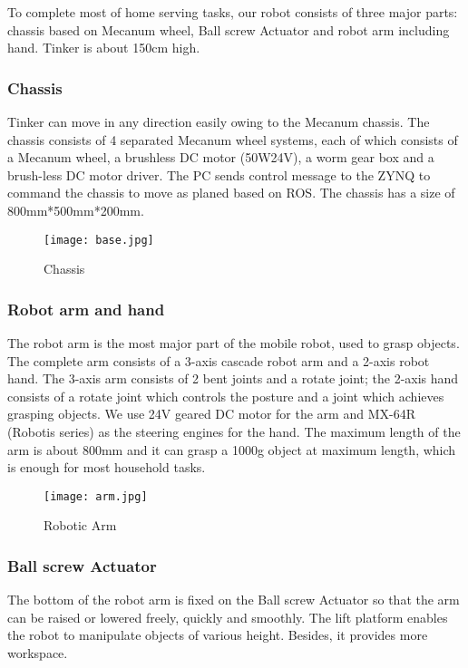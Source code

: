To complete most of home serving tasks, our robot consists of three major parts: chassis based on Mecanum wheel, Ball screw Actuator and robot arm including hand. Tinker is about 150cm high. 
\subsubsection{Chassis}
Tinker can move in any direction easily owing to the Mecanum chassis. The chassis consists of 4 separated Mecanum wheel systems, each of which consists of a Mecanum wheel, a brushless DC motor (50W24V), a worm gear box and a brush-less DC motor driver. The PC sends control message to the ZYNQ to command the chassis to move as planed based on ROS. The chassis has a size of 800mm*500mm*200mm.
\begin{figure}[!t]
\centering
\texttt{[image: base.jpg]}
    \caption{Chassis}
\end{figure}

\subsubsection{Robot arm and hand}
The robot arm is the most major part of the mobile robot, used to grasp objects. The complete arm consists of a 3-axis cascade robot arm and a 2-axis robot hand. The 3-axis arm consists of 2 bent joints and a rotate joint; the 2-axis hand consists of a rotate joint which controls the posture and a joint which achieves grasping objects. We use 24V geared DC motor for the arm and MX-64R (Robotis series) as the steering engines for the hand. The maximum length of the arm is about 800mm and it can grasp a 1000g object at maximum length, which is enough for most household tasks. 
\begin{figure*}[!t]
	\centering
    \texttt{[image: arm.jpg]}
    \caption{Robotic Arm}
\end{figure*}

\subsubsection{Ball screw Actuator}
The bottom of the robot arm is fixed on the Ball screw Actuator so that the arm can be raised or lowered freely, quickly and smoothly. The lift platform enables the robot to manipulate objects of various height. Besides, it provides more workspace.



